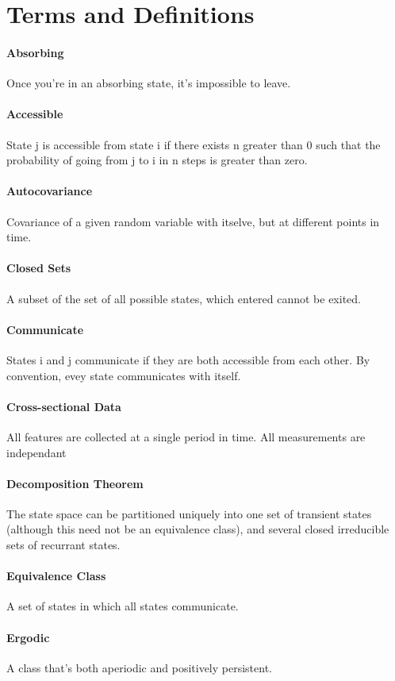 \documentclass[12pt]{article}
\begin{document}
\section{Terms and Definitions}
    \paragraph{Absorbing} Once you're in an absorbing state, it's impossible to leave.
    \paragraph{Accessible} State j is accessible from state i if there exists n greater than 0 such that the probability of going from j to i in n steps is greater than zero.
    \paragraph{Autocovariance} Covariance of a given random variable with itselve, but at different points in time.
    \paragraph{Closed Sets} A subset of the set of all possible states, which entered cannot be exited.
    \paragraph{Communicate} States i and j communicate if they are both accessible from each other. By convention, evey state communicates with itself.
    \paragraph{Cross-sectional Data} All features are collected at a single period in time. All measurements are independant
    \paragraph{Decomposition Theorem} The state space can be partitioned uniquely into one set of transient states (although this need not be an equivalence class), and several closed irreducible sets of recurrant states.
    \paragraph{Equivalence Class} A set of states in which all states communicate.
    \paragraph{Ergodic} A class that's both aperiodic and positively persistent.
\end{document}
